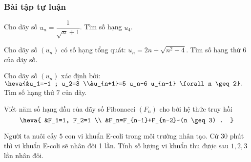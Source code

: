 \subsubsection{Bài tập tự luận}
 
\begin{bt}%
	Cho dãy số $u_n=\dfrac{1}{\sqrt{n}+1}$. Tìm số hạng $u_4$.	
\end{bt}
\begin{bt}%
	Cho dãy số $(u_n)$ có số hạng tổng quát: $u_n=2 n+\sqrt{n^2+4}$. Tìm số hạng thứ $6$ của dãy số.
\end{bt}
\begin{bt}%
	Cho dãy số $(u_n)$ xác định bởi: $\heva{&u_1=-1 ; u_2=3 \\&u_{n+1}=5 u_n-6 u_{n-1} \forall n \geq 2}.$ Tìm số hạng thứ $7$ của dãy.
\end{bt}
\begin{bt}%
	Viết năm số hạng đầu của dãy số Fibonacci $\left(F_n\right)$ cho bởi hệ thức truy hồi
	$$
	\heva{
		&F_1=1, F_2=1 \\
		&F_n=F_{n-1}+F_{n-2}~(n \geq 3) .
	}
	$$
\end{bt}
\begin{bt}%
	Người ta nuôi cấy $5$ con vi khuẩn E-coli trong môi trường nhân tạo. Cứ $30$ phút thì vi khuẩn E-coli sẽ nhân đôi 1 lần. Tính số lượng vi khuẩn thu được sau $1,2,3$ lần nhân đôi.
\end{bt}
